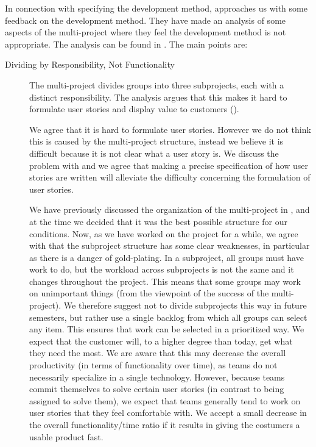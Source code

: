 In connection with specifying the development method,  approaches us with some feedback on the development method. They have made an analysis of some aspects of the multi-project where they feel the development method is not appropriate. The analysis can be found in . The main points are:
\begin{description}
  \item[Dividing by Responsibility, Not Functionality] The multi-project divides groups into three subprojects, each with a distinct responsibility. The analysis argues that this makes it hard to formulate user stories and display value to customers ().

  We agree that it is hard to formulate user stories. However we do not think this is caused by the multi-project structure, instead we believe it is difficult because it is not clear what a user story is. We discuss the problem with  and we agree that making a precise specification of how user stories are written will alleviate the difficulty concerning the formulation of user stories.

  We have previously discussed the organization of the multi-project in , and at the time we decided that it was the best possible structure for our conditions. Now, as we have worked on the project for a while, we agree with  that the subproject structure has some clear weaknesses, in particular as there is a danger of gold-plating. In a subproject, all groups must have work to do, but the workload across subprojects is not the same and it changes throughout the project. This means that some groups may work on unimportant things (from the viewpoint of the success of the multi-project). We therefore suggest not to divide subprojects this way in future semesters, but rather use a single backlog from which all groups can select any item. This ensures that work can be selected in a prioritized way. We expect that the customer will, to a higher degree than today, get what they need the most. We are aware that this may decrease the overall productivity (in terms of functionality over time), as teams do not necessarily specialize in a single technology. However, because teams commit themselves to solve certain user stories (in contrast to being assigned to solve them), we expect that teams generally tend to work on user stories that they feel comfortable with. We accept a small decrease in the overall functionality/time ratio if it results in giving the costumers a usable product fast.


\end{description}
